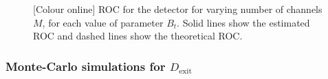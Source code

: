 \documentclass[11pt]{article}
\begin{document}
\begin{figure}[h]
\caption{[Colour online] ROC for the detector for varying number of channels $M$, for each value of parameter $B_{t}$. Solid lines show the estimated ROC and dashed lines show the theoretical ROC.}
\label{fig:ROCdentry}
\end{figure}


\subsubsection{Monte-Carlo simulations for $D_{\text{exit}}$}
\label{subsubsec:exitDetector_working}
\end{document}
